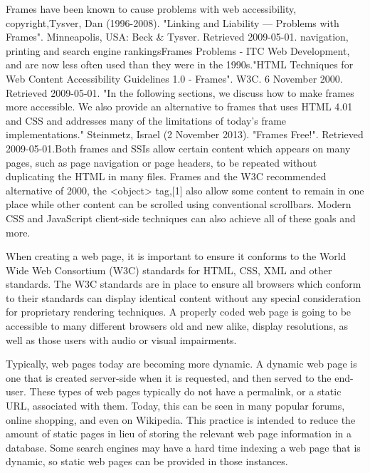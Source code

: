 Frames have been known to cause problems with web accessibility, copyright,Tysver, Dan (1996-2008). "Linking and Liability — Problems with Frames". Minneapolis, USA: Beck \& Tysver. Retrieved 2009-05-01. navigation, printing and search engine rankingsFrames Problems - ITC Web Development, and are now less often used than they were in the 1990s."HTML Techniques for Web Content Accessibility Guidelines 1.0 - Frames". W3C. 6 November 2000. Retrieved 2009-05-01. "In the following sections, we discuss how to make frames more accessible. We also provide an alternative to frames that uses HTML 4.01 and CSS and addresses many of the limitations of today's frame implementations." Steinmetz, Israel (2 November 2013). "Frames Free!". Retrieved 2009-05-01.Both frames and SSIs allow certain content which appears on many pages, such as page navigation or page headers, to be repeated without duplicating the HTML in many files. Frames and the W3C recommended alternative of 2000, the <object> tag,[1] also allow some content to remain in one place while other content can be scrolled using conventional scrollbars. Modern CSS and JavaScript client-side techniques can also achieve all of these goals and more.

When creating a web page, it is important to ensure it conforms to the World Wide Web Consortium (W3C) standards for HTML, CSS, XML and other standards. The W3C standards are in place to ensure all browsers which conform to their standards can display identical content without any special consideration for proprietary rendering techniques. A properly coded web page is going to be accessible to many different browsers old and new alike, display resolutions, as well as those users with audio or visual impairments.






	


Typically, web pages today are becoming more dynamic. A dynamic web page is one that is created server-side when it is requested, and then served to the end-user. These types of web pages typically do not have a permalink, or a static URL, associated with them. Today, this can be seen in many popular forums, online shopping, and even on Wikipedia. This practice is intended to reduce the amount of static pages in lieu of storing the relevant web page information in a database. Some search engines may have a hard time indexing a web page that is dynamic, so static web pages can be provided in those instances.




